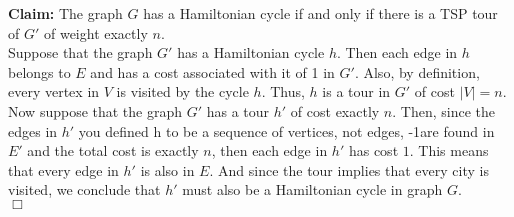 \documentclass{article}
\newcommand{\add}[1]{\textcolor{dkgreen}{#1}}
\newcommand{\qed}{\hfill \ensuremath{\Box}}
\begin{document}
  {\bf Claim: } The graph $G$ has a Hamiltonian cycle if and only
  if there is a TSP tour of $G'$ of weight exactly $n$. \\
  
  Suppose that the graph $G'$ has a Hamiltonian cycle $h$. Then
  each edge in $h$ belongs to $E$ and has a cost associated with
  it of 1 in $G'$. Also, by definition, every vertex in $V$
  is visited by the cycle $h$. Thus, $h$ is a tour in $G'$ of 
  cost $|V|=n$. \\
  
  Now suppose that the graph $G'$ has a tour $h'$ of cost exactly $n$.
  Then, since the edges in $h'$ \add{you defined h to be a sequence of vertices, not edges, -1}are found in $E'$ and the total cost
  is exactly $n$, then each edge in $h'$ has cost $1$. This
  means that every edge in $h'$ is also in $E$. And since the tour
  implies that every city is visited, we conclude
  that $h'$ must also be a Hamiltonian cycle in graph $G$. \\
  
  \qed
    
\end{document}
